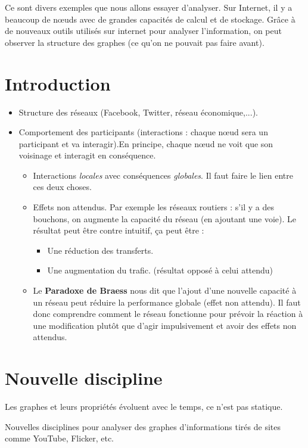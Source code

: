 Ce sont divers exemples que nous allons essayer d'analyser. Sur Internet, il y a beaucoup de nœuds avec de grandes capacités de calcul et de stockage. Grâce à de nouveaux outils utilisés sur internet pour analyser l'information, on peut observer la structure des graphes (ce qu'on ne pouvait pas faire avant).

\section{Introduction}
\begin{itemize}
\item Structure des réseaux (Facebook, Twitter, réseau économique,...).
\item Comportement des participants (interactions : chaque nœud sera un participant et va interagir).En principe, chaque nœud ne voit que son voisinage et interagit en conséquence.

\begin{itemize}
	\item Interactions \textit{locales} avec conséquences \textit{globales}.
	Il faut faire le lien entre ces deux choses.
	\item Effets non attendus. Par exemple les réseaux routiers : s'il y a des bouchons, on augmente la capacité du réseau (en ajoutant une voie). 
	Le résultat peut être contre intuitif, ça peut être :
	\begin{itemize} 
		\item Une réduction des transferts.
		\item Une augmentation du trafic. (résultat opposé à celui attendu)
	\end{itemize}	
	\item Le \textbf{Paradoxe de Braess} nous dit que l'ajout d'une nouvelle capacité à un réseau peut réduire la performance globale (effet non attendu).
Il faut donc comprendre comment le réseau fonctionne pour prévoir la réaction à une modification plutôt que d'agir impulsivement et avoir des effets non attendus.
\end{itemize}
\end{itemize}

\section{Nouvelle discipline}
Les graphes et leurs propriétés évoluent avec le temps, ce n'est pas statique.

Nouvelles disciplines pour analyser des graphes d'informations tirés de sites comme YouTube, Flicker, etc.


